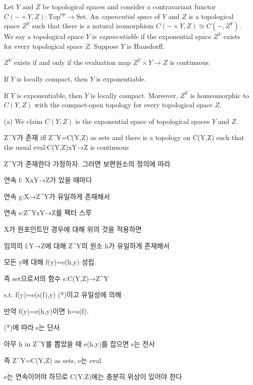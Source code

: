 \documentclass{../../large}
\begin{document}
\begin{prb}
Let $Y$ and $Z$ be topological spaces and consider a contravariant functor $C(-\times Y,Z):\mathrm{Top}^{\mathrm{op}}\to\mathrm{Set}$.
An \emph{exponential space} of $Y$ and $Z$ is a topological space $Z^Y$ such that there is a natural isomorphism $C(-\times Y,Z)\cong C(-,Z^Y)$.
We say a topological space $Y$ is \emph{exponentiable} if the exponential space $Z^Y$ exists for every topological space $Z$.
Suppose $Y$ is Hausdorff.
\begin{parts}
\item
$Z^Y$ exists if and only if the evaluation map $Z^Y\times Y\to Z$ is continuous.
\item
If $Y$ is locally compact, then $Y$ is exponentiable.
\item
If $Y$ is exponentiable, then $Y$ is locally compact.
Moreover, $Z^Y$ is homeomorphic to $C(Y,Z)$ with the compact-open topology for every topological space $Z$.
\end{parts}
\end{prb}
\begin{pf}
(a)
We claim $C(Y,Z)$ is the exponential space of topological spaces $Y$ and $Z$.

\end{pf}



\iffalse
Z^Y가 존재 iff Z^Y=C(Y,Z) as sets and there is a topology on C(Y,Z) such that the usual eval:C(Y,Z)xY→Z is continuous

Z^Y가 존재한다 가정하자. 그러면 보편원소의 정의에 따라

연속 f: XxY→Z가 있을 때마다

연속 g:X→Z^Y가 유일하게 존재해서

연속 e:Z^YxY→Z를 팩터 스루

X가 원포인트인 경우에 대해 위의 것을 적용하면

임의의 f:Y→Z에 대해 Z^Y의 원소 h가 유일하게 존재해서

모든 y에 대해 f(y)=e(h,y) 성립.

즉 set으로서의 함수 s:C(Y,Z)→Z^Y

s.t. f(y)=e(s(f),y) (*)이고 유일성에 의해

만약 f(y)=e(h,y)이면 h=s(f).

(*)에 따라 s는 단사.

아무 h in Z^Y를 뽑았을 때 e(h,y)를 잡으면 s는 전사

즉 Z^Y=C(Y,Z) as sets, e는 eval

e는 연속이어야 하므로 C(Y,Z)에는 충분히 위상이 있어야 한다
\end{document}
